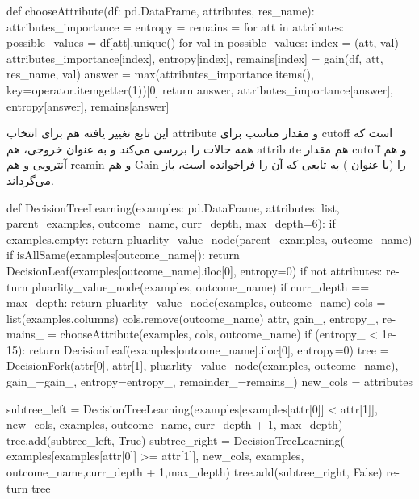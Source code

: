\documentclass[12pt,titlepage,a4page , tikz , multi,table , svgnames,xcdraw]{article}
\begin{document}
 \begin{latin}
\begin{python}[language=Python]


def chooseAttribute(df: pd.DataFrame, attributes, res_name):
    attributes_importance = {}
    entropy = {}
    remains = {}
    for att in attributes:
        possible_values = df[att].unique()
        for val in possible_values:
            index = (att, val)
            attributes_importance[index], entropy[index], remains[index]
             = gain(df, att, res_name, val)
    answer = max(attributes_importance.items(),
     key=operator.itemgetter(1))[0]
    return answer, attributes_importance[answer], entropy[answer],
     remains[answer]


\end{python}

\end{latin}

این تابع تغییر یافته هم برای انتخاب attribute و مقدار مناسب برای cutoff است که همه حالات را بررسی می‌کند و به عنوان خروجی، هم attribute هم مقدار cutoff و هم آنتروپی و هم reamin و هم Gain را (با عنوان ) به تابعی که آن را فراخوانده است، باز می‌گرداند.

\newpage


 \begin{latin}
\begin{python}[language=Python]


def DecisionTreeLearning(examples: pd.DataFrame,
 attributes: list, parent_examples, outcome_name, curr_depth,
                         max_depth=6):
    if examples.empty:
        return pluarlity_value_node(parent_examples, outcome_name)
    if isAllSame(examples[outcome_name]):
        return DecisionLeaf(examples[outcome_name].iloc[0], entropy=0)
    if not attributes:
        return pluarlity_value_node(examples, outcome_name)
    if curr_depth == max_depth:
        return pluarlity_value_node(examples, outcome_name)
    cols = list(examples.columns)
    cols.remove(outcome_name)
    attr, gain_, entropy_, remains_ =
     chooseAttribute(examples, cols, outcome_name)
    if (entropy_ < 1e-15):
        return DecisionLeaf(examples[outcome_name].iloc[0], entropy=0)
    tree = DecisionFork(attr[0], attr[1],
     pluarlity_value_node(examples, outcome_name), gain_=gain_, entropy=entropy_,
                        remainder_=remains_)
    new_cols = attributes

    subtree_left = DecisionTreeLearning(examples[examples[attr[0]] < attr[1]],
     new_cols, examples, outcome_name,
                                        curr_depth + 1,
                                        max_depth)
    tree.add(subtree_left, True)
    subtree_right = DecisionTreeLearning(
    examples[examples[attr[0]] >= attr[1]],
     new_cols, examples, outcome_name,curr_depth + 1,max_depth)
    tree.add(subtree_right, False)
    return tree

\end{python}

\end{latin}
\end{document}

